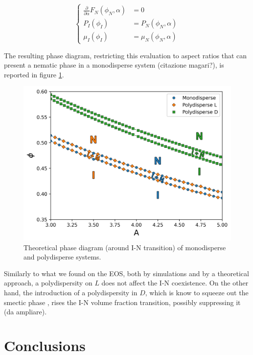 \documentclass[journal=jacsat,manuscript=article]{achemso}
\begin{document}
\begin{equation}
\begin{cases}
	\frac{\partial}{\partial \alpha}  F_N(\phi_N, \alpha) &= 0\\
	P_I(\phi_I) &= P_N(\phi_N, \alpha) \\
	\mu_I(\phi_I) &= \mu_N(\phi_N, \alpha)
\end{cases}
\end{equation}


The resulting phase diagram, restricting this evaluation to aspect ratios that can present a nematic phase in a monodisperse system (citazione magari?), is reported in figure \ref{fig:TH_phasediagram}.

\begin{figure}[!h]
	\centering
	\includegraphics[width=0.9 \columnwidth]{Figures/Phase Diagram3_5.png}
	\caption{Theoretical phase diagram (around I-N transition) of monodisperse and polydisperse systems.}
	\label{fig:TH_phasediagram}
\end{figure}

Similarly to what we found on the EOS, both by simulations and by a theoretical approach, a polydispersity on $L$ does not affect the I-N coexistence. On the other hand, the introduction of a polydispersity in $D$, which is know to squeeze out the smectic phase \cite{frenkel1998polydispersity}, rises the I-N volume fraction transition, possibly suppressing it (da ampliare).


\section{Conclusions}
\end{document}
